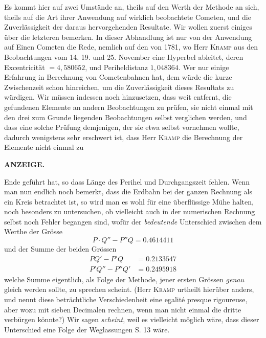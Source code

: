 Es kommt hier auf zwei Umstände an, theils auf den Werth der Methode an sich, theils auf die Art ihrer
Anwendung auf wirklich beobachtete Cometen, und die Zuverlässigkeit der daraus hervorgehenden Resultate.
Wir wollen zuerst einiges über die letzteren bemerken. In dieser Abhandlung ist nur von der Anwendung auf
Einen Cometen die Rede, nemlich auf den von 1781, wo Herr \textsc{Kramp} aus den Beobachtungen vom 14, 19. und
25. November eine Hyperbel ableitet, deren Excentricität $= 4,580652$, und Periheldistanz $1,048364$. Wer
nur einige Erfahrung in Berechnung von Cometenbahnen hat, dem würde die kurze Zwischenzeit schon hinreichen,
um die Zuverlässigkeit dieses Resultats zu würdigen. Wir müssen indessen noch hinzusetzen, dass weit
entfernt, die gefundenen Elemente an andern Beobachtungen zu prüfen, sie nicht einmal mit den drei zum
Grunde liegenden Beobachtungen selbst verglichen werden, und dass eine solche Prüfung demjenigen, der sie
etwa selbst vornehmen wollte, dadurch wenigstens sehr erschwert ist, dass Herr \textsc{Kramp} die Berechnung
der Elemente nicht einmal zu
\par
\clearpage
\thispagestyle{empty}
\noindent{}%
%
\parbox[t]{\dimexpr\linewidth-24mm\relax}{\centering\footnotesize\bfseries ANZEIGE.}%
\makebox[12mm][r]{}\par\nobreak\medskip
\noindent Ende geführt hat, so dass Länge des Perihel und Durchgangszeit fehlen. Wenn man nun endlich noch bemerkt,
dass die Erdbahn bei der ganzen Rechnung als ein Kreis betrachtet ist, so wird man es wohl für eine
überflüssige Mühe halten, noch besonders zu untersuchen, ob vielleicht auch in der numerischen
Rechnung selbst noch Fehler begangen sind, wofür der \emph{bedeutende} Unterschied zwischen dem Werthe der
Grösse
\[
P\!\cdot\!Q'' - P''Q = 0.4614411
\]
und der Summe der beiden Grössen
\[
\begin{aligned}
PQ' - P'Q &= 0.2133547\\
P'Q'' - P''Q' &= 0.2495918
\end{aligned}
\]
welche Summe eigentlich, als Folge der Methode, jener ersten Grössen \emph{genau} gleich werden sollte, zu
sprechen scheint. (Herr \textsc{Kramp} urtheilt hierüber anders, und nennt diese beträchtliche Verschiedenheit
eine egalité presque rigoureuse, aber wozu mit sieben Decimalen rechnen, wenn man nicht einmal die dritte
verbürgen könnte?) Wir sagen \emph{scheint}, weil es vielleicht möglich wäre, dass dieser Unterschied
eine Folge der Weglassungen S. 13 wäre.

